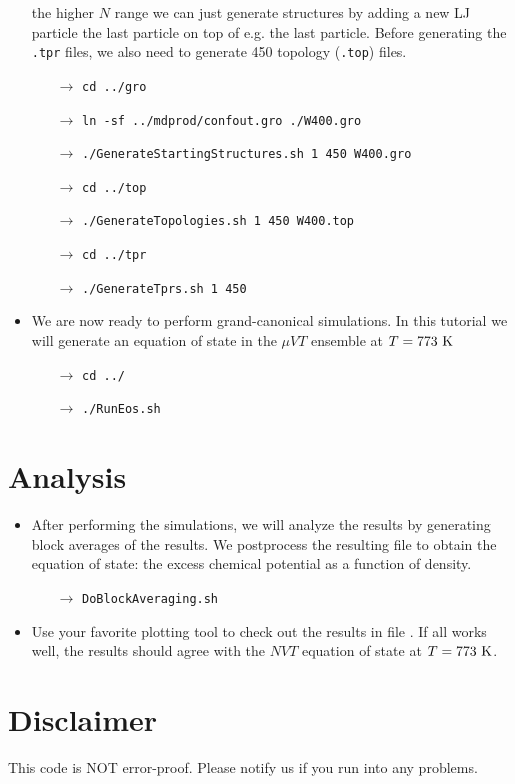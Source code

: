 \documentclass[fleqn,a4paper,12pt]{article}
\begin{document}
\begin{itemize}
  	the higher $N$ range we can just generate structures by adding a new LJ
  	particle the last particle on top of e.g. the last particle. Before
  	generating the {\tt .tpr} files, we also need to generate 450 topology
  	({\tt .top}) files.
  	\begin{itemize}
  	  	\item[$\to$] {\tt cd ../gro}
  	  	\item[$\to$] {\tt ln -sf ../mdprod/confout.gro ./W400.gro}
  	  	\item[$\to$] {\tt ./GenerateStartingStructures.sh 1 450 W400.gro}
  	  	\item[$\to$] {\tt cd ../top}
  	  	\item[$\to$] {\tt ./GenerateTopologies.sh 1 450 W400.top}
  	  	\item[$\to$] {\tt cd ../tpr}
  	  	\item[$\to$] {\tt ./GenerateTprs.sh 1 450}
  	\end{itemize}
  	\item We are now ready to perform grand-canonical simulations. In this
  	tutorial we will generate an equation of state in the $\mu VT$ ensemble at
  	$T=773~\rm K$
  	\begin{itemize}
  	  	\item[$\to$] {\tt cd ../}
  	  	\item[$\to$] {\tt ./RunEos.sh}
  	\end{itemize}
\end{itemize}

\section{Analysis}
\begin{itemize}
  	\item After performing the simulations, we will analyze the results by
  	generating block averages of the results. We postprocess the resulting file to obtain the equation of state: the
  	excess chemical potential as a function of density.
  	\begin{itemize}
  	  	\item[$\to$] {\tt DoBlockAveraging.sh}
  	\end{itemize}
  	\item Use your favorite plotting tool to check out the results in file
  	. If all works
  	well, the results should agree with the $NVT$ equation of state at $T=773~\rm K$.
\end{itemize}

\section*{Disclaimer}
This code is NOT error-proof. Please notify us if you run into any problems.
\end{document}
